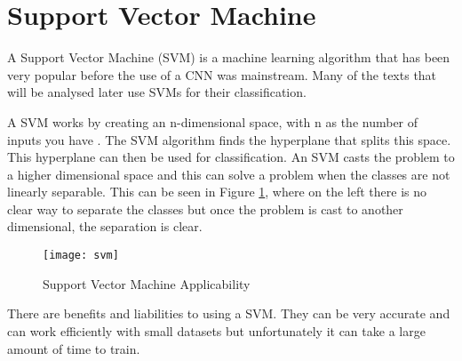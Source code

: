 \section{Support Vector Machine}
A Support Vector Machine (SVM) is a machine learning algorithm that has been
very popular before the use of a CNN was mainstream.
Many of the texts that will be analysed later use SVMs for their classification.

A SVM works by creating an n-dimensional space, with n as the number of
inputs you have \textcite{svm}. The SVM algorithm finds the hyperplane that splits this space.
This hyperplane can then be used for classification. 
An SVM casts the problem to a higher dimensional space and this can solve a problem when the classes are not linearly separable.
This can be seen in Figure \ref{fig:svm}, where on the left there is no clear way to separate the classes but once the problem is cast to another dimensional, the separation is clear.

\begin{figure}[h]
    \texttt{[image: svm]}
    \caption{Support Vector Machine Applicability}
    \label{fig:svm}
\end{figure}

There are benefits and liabilities to using a SVM.
They can be very accurate and can work efficiently with small datasets but unfortunately it can take a large amount of time to train. 